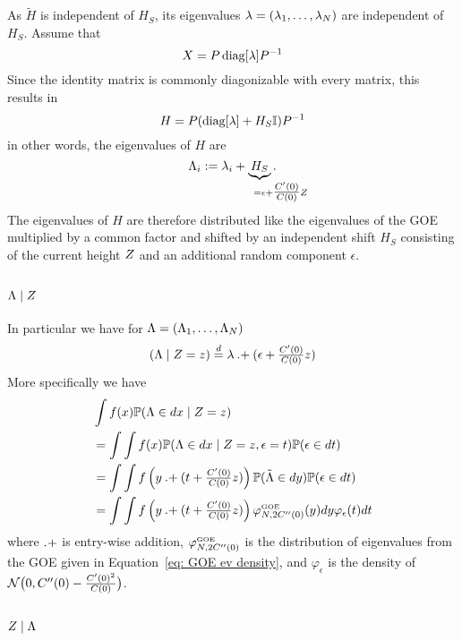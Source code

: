 As \(\tilde{H}\) is independent of \(H_S\), its eigenvalues
\(\lambda=(\lambda_1,\dots,\lambda_N)\) are independent of
\(H_S\). Assume that
\[
	X = P\operatorname{diag}[\lambda]P^{-1}
\]
Since the identity matrix is commonly diagonizable with every matrix, this
results in
\[
	H = P(\operatorname{diag}[\lambda] + H_S\mathbb{I}) P^{-1}
\]
in other words, the eigenvalues of \(H\) are
\[
	\Lambda_i
	:= \lambda_i + \underbrace{H_S}_{=\epsilon \mathrlap{+ \tfrac{\sqC'(0)}{\sqC(0)}\rf}}.
\]
The eigenvalues of \(H\) are therefore distributed like the eigenvalues of the
GOE multiplied by a common factor and shifted by an independent shift \(H_S\)
consisting of the current height \(Z\) and an additional random component
\(\epsilon\).

\subsection{\texorpdfstring{\(\Lambda\mid Z\)}{Λ|Z}}
\label{subsec: Lambda|rf}

In particular we have for \(\Lambda = (\Lambda_1,\dots,\Lambda_N)\)
\[
	(\Lambda \mid Z = z)
	\overset{d}= 
	\lambda \mathbin{.+} (\epsilon + \tfrac{C'(0)}{C(0)}z)
\]
More specifically we have
\[
	\begin{aligned}
		&\int f(x) \mathbb{P}(\Lambda \in dx\mid Z=z)\\
		&= \int
		\int f(x) \mathbb{P}(\Lambda \in dx\mid Z=z, \epsilon=t)
		\mathbb{P}(\epsilon\in dt)\\
		&= \int \int f\left(y \mathbin{.+} (t + \tfrac{C'(0)}{C(0)}z)\right)
		\mathbb{P}(\tilde{\Lambda}\in dy)
		\mathbb{P}(\epsilon \in dt)\\
		&= \int \int f\left(y \mathbin{.+} (t + \tfrac{C'(0)}{C(0)}z)\right)
		\varphi^{\text{\tiny GOE}}_{N,2C''(0)}(y) dy \varphi_\epsilon(t)dt\\
	\end{aligned}
\]
where \(\mathbin{.+}\) is entry-wise addition, \(\varphi^{\text{\tiny GOE}}_{N,
2C''(0)}\) is the distribution of eigenvalues from the GOE given in
Equation~\eqref{eq: GOE ev density}, and \(\varphi_\epsilon\) is the density of
\(\mathcal{N}\big(0, C''(0)-\tfrac{C'(0)^2}{C(0)}\big)\).

\subsection{\texorpdfstring{\(Z\mid\Lambda\)}{Z|Λ}}

